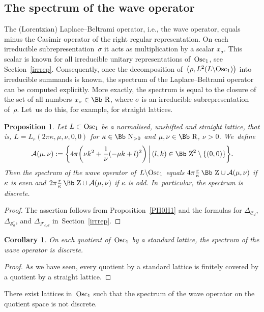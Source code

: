 \documentclass[pdftex]{sigma}
\newcommand\RR{{\mbox{\Bb R}}}
\newcommand\NN{{\mbox{\Bb N}}}
\newcommand\ZZ{{\mbox{\Bb Z}}}
\newcommand\cC{{\mathcal C}}
\newcommand\cA{{\mathcal A}}
\newcommand\cF{{\mathcal F}}
\newcommand{\Osc}{{\rm Osc}}
\numberwithin{equation}{section}
\newtheorem{Corollary}[Theorem]{Corollary}
\newtheorem{Proposition}[Theorem]{Proposition}
 { \theoremstyle{definition}
\newtheorem{Definition}[Theorem]{Definition}
\newtheorem{Note}[Theorem]{Note}
\newtheorem{Example}[Theorem]{Example}
\newtheorem{Remark}[Theorem]{Remark} }
\begin{document}
\subsection{The spectrum of the wave operator} \label{rmwave}
The (Lorentzian) Laplace--Beltrami operator, i.e., the wave operator, equals minus the Casimir operator of the right regular representation. On each irreducible subrepresentation~$\sigma$ it acts as multiplication by a scalar $x_\sigma$. This scalar is known for all irreducible unitary representations of~$\Osc_1$, see Section~\ref{irrrep}. Consequently, once the decomposition of~$\big(\rho,L^2(L\backslash\Osc_1)\big)$ into irreducible summands is known, the spectrum of the Laplace--Beltrami operator can be computed explicitly. More exactly, the spectrum is equal to the closure of the set of all numbers $x_\sigma\in\RR$, where $\sigma$ is an irreducible subrepresentation of~$\rho$. Let~us do this, for example, for straight lattices.

\begin{Proposition} Let $L\subset\Osc_1$ be a normalised, unshifted and straight lattice, that is, $L=L_r(2\pi\kappa,\mu,\nu,0,0)$ for $\kappa\in\NN_{>0}$ and $\mu,\nu\in\RR$, $\nu>0$. We~define
\begin{gather*}
\cA(\mu,\nu):=\bigg\{4\pi \bigg(\nu
k^2+\frac1\nu(-\mu k+l)^2\bigg)\, \bigg|\, (l,k)\in\ZZ^2\setminus\{(0,0)\}\bigg\}.
\end{gather*}
Then the spectrum of the wave operator of~$L\backslash \Osc_1$ equals
$4\pi\frac r\kappa\,\ZZ\cup \cA(\mu,\nu)$ if $\kappa$ is even and $2\pi\frac r\kappa\,\ZZ\cup \cA(\mu,\nu)$ if $\kappa$ is odd. In~particular, the spectrum is discrete.
\end{Proposition}

\begin{proof}The assertion follows from Proposition~\ref{PH0H1} and the formulas for $\Delta_{\cC_d}$, $\Delta_{{\mathcal S}_a^\tau}$, and $\Delta_{\cF_{c,d}}$ in~Section~\ref{irrrep}.
\end{proof}

\begin{Corollary}On each quotient of~$\Osc_1$ by a standard lattice, the spectrum of the wave operator is discrete.
\end{Corollary}
\begin{proof}
As we have seen, every quotient by a standard lattice is finitely covered by a quotient by a straight lattice.
\end{proof}

There exist lattices in~$\Osc_1$ such that the spectrum of the wave operator on the quotient space is not discrete.
\end{document}
